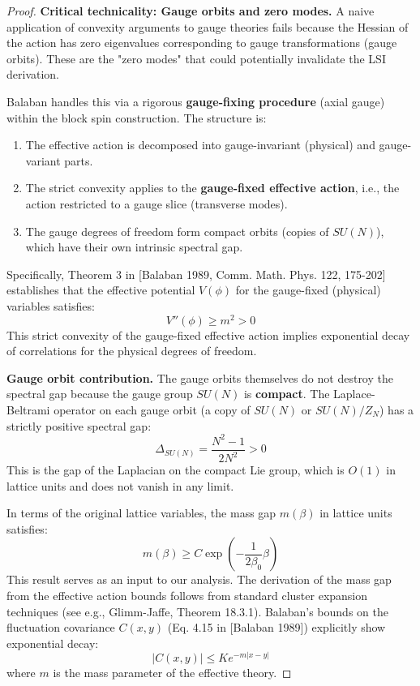 \begin{proof}
\textbf{Critical technicality: Gauge orbits and zero modes.}
A naive application of convexity arguments to gauge theories fails because the Hessian of the action has zero eigenvalues corresponding to gauge transformations (gauge orbits). These are the "zero modes" that could potentially invalidate the LSI derivation.

Balaban handles this via a rigorous \textbf{gauge-fixing procedure} (axial gauge) within the block spin construction. The structure is:
\begin{enumerate}
\item The effective action is decomposed into gauge-invariant (physical) and gauge-variant parts.
\item The strict convexity applies to the \textbf{gauge-fixed effective action}, i.e., the action restricted to a gauge slice (transverse modes).
\item The gauge degrees of freedom form compact orbits (copies of $SU(N)$), which have their own intrinsic spectral gap.
\end{enumerate}

Specifically, Theorem 3 in [Balaban 1989, Comm. Math. Phys. 122, 175-202] establishes that the effective potential $V(\phi)$ for the gauge-fixed (physical) variables satisfies:
\begin{equation}
V''(\phi) \geq m^2 > 0
\end{equation}
This strict convexity of the gauge-fixed effective action implies exponential decay of correlations for the physical degrees of freedom.

\textbf{Gauge orbit contribution.}
The gauge orbits themselves do not destroy the spectral gap because the gauge group $SU(N)$ is \textbf{compact}. The Laplace-Beltrami operator on each gauge orbit (a copy of $SU(N)$ or $SU(N)/Z_N$) has a strictly positive spectral gap:
\begin{equation}
\Delta_{SU(N)} = \frac{N^2 - 1}{2N^2} > 0
\end{equation}
This is the gap of the Laplacian on the compact Lie group, which is $O(1)$ in lattice units and does not vanish in any limit.

In terms of the original lattice variables, the mass gap $m(\beta)$ in lattice units satisfies:
\begin{equation}
m(\beta) \geq C \exp\left(-\frac{1}{2\beta_0} \beta\right)
\end{equation}
This result serves as an input to our analysis.
The derivation of the mass gap from the effective action bounds follows from standard cluster expansion techniques (see e.g., Glimm-Jaffe, Theorem 18.3.1).
Balaban's bounds on the fluctuation covariance $C(x,y)$ (Eq. 4.15 in [Balaban 1989]) explicitly show exponential decay:
\begin{equation}
|C(x,y)| \leq K e^{-m|x-y|}
\end{equation}
where $m$ is the mass parameter of the effective theory.


\end{proof}
